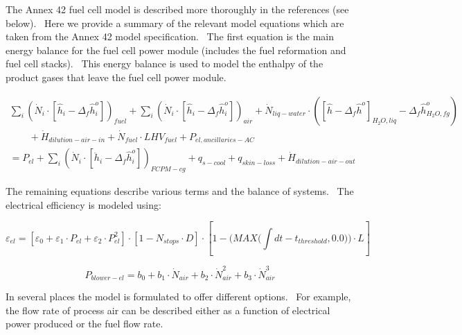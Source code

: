 The Annex 42 fuel cell model is described more thoroughly in the references (see below).~ Here we provide a summary of the relevant model equations which are taken from the Annex 42 model specification.~ The first equation is the main energy balance for the fuel cell power module (includes the fuel reformation and fuel cell stacks).~ This energy balance is used to model the enthalpy of the product gases that leave the fuel cell power module.

\begin{equation}
  \begin{array}{l}
    {\sum\limits_i {\left( {{{\dot N}_i} \cdot \left[ {{{\hat h}_i} - {\Delta_f}\hat h_i^o} \right]} \right)}_{fuel}} + {\sum\limits_i {\left( {{{\dot N}_i} \cdot \left[ {{{\hat h}_i} - {\Delta_f}\hat h_i^o} \right]} \right)}_{air}} + {{\dot N}_{liq - water}} \cdot \left( {{{\left[ {\hat h - {\Delta_f}{{\hat h}^o}} \right]}_{{H_2}O,liq}} - {\Delta_f}\hat h_{{H_2}O,fg}^o} \right) \\
    \quad \quad  + {{\dot H}_{dilution - air - in}} + {{\dot N}_{fuel}} \cdot LH{V_{fuel}} + {P_{el,ancillaries - AC}} \\
    = {P_{el}} + {\sum\limits_i {\left( {{{\dot N}_i} \cdot \left[ {{{\ddot h}_i} - {\Delta_f}\hat h_i^o} \right]} \right)}_{FCPM - cg}} + {q_{s - cool}} + {q_{skin - loss}} + {{\dot H}_{dilution - air - out}}
  \end{array}
\end{equation}

The remaining equations describe various terms and the balance of systems.~ The electrical efficiency is modeled using:

\begin{equation}
{\varepsilon_{el}} = \left[ {{\varepsilon_0} + {\varepsilon_1} \cdot {P_{el}} + {\varepsilon_2} \cdot P_{el}^2} \right] \cdot \left[ {1 - {N_{stops}} \cdot D} \right] \cdot \left[ {1 - (MAX(\int\limits_{} {dt - {t_{threshold}},0.0))}  \cdot L} \right]
\end{equation}

\begin{equation}
{P_{blower - el}} = {b_0} + {b_1} \cdot {\dot N_{air}} + {b_2} \cdot \dot N_{air}^2 + {b_3} \cdot \dot N_{air}^3
\end{equation}

In several places the model is formulated to offer different options.~ For example, the flow rate of process air can be described either as a function of electrical power produced or the fuel flow rate.

